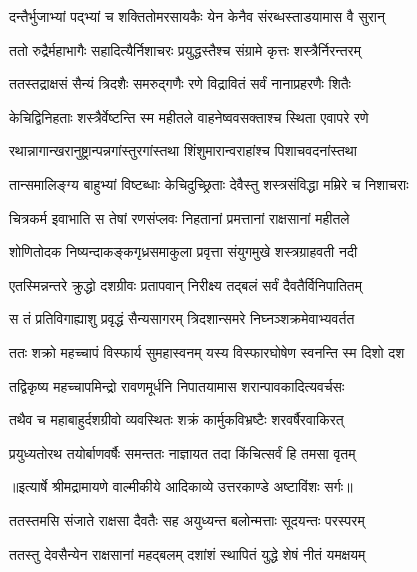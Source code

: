 \twolineshloka
{दन्तैर्भुजाभ्यां पद्भ्यां च शक्तितोमरसायकैः}
{येन केनैव संरब्धस्ताडयामास वै सुरान्} %

\twolineshloka
{ततो रुद्रैर्महाभागैः सहादित्यैर्निशाचरः}
{प्रयुद्धस्तैश्च संग्रामे कृत्तः शस्त्रैर्निरन्तरम्} %

\twolineshloka
{ततस्तद्राक्षसं सैन्यं त्रिदशैः समरुद्गणैः}
{रणे विद्रावितं सर्वं नानाप्रहरणैः शितैः} %

\twolineshloka
{केचिद्विनिहताः शस्त्रैर्वेष्टन्ति स्म महीतले}
{वाहनेष्ववसक्ताश्च स्थिता एवापरे रणे} %

\twolineshloka
{रथान्नागान्खरानुष्ट्रान्पन्नगांस्तुरगांस्तथा}
{शिंशुमारान्वराहांश्च पिशाचवदनांस्तथा} %

\twolineshloka
{तान्समालिङ्ग्य बाहुभ्यां विष्टब्धाः केचिदुच्छ्रिताः}
{देवैस्तु शस्त्रसंविद्धा मम्रिरे च निशाचराः} %

\twolineshloka
{चित्रकर्म इवाभाति स तेषां रणसंप्लवः}
{निहतानां प्रमत्तानां राक्षसानां महीतले} %

\twolineshloka
{शोणितोदक निष्यन्दाकङ्कगृध्रसमाकुला}
{प्रवृत्ता संयुगमुखे शस्त्रग्राहवती नदी} %

\twolineshloka
{एतस्मिन्नन्तरे क्रुद्धो दशग्रीवः प्रतापवान्}
{निरीक्ष्य तद्बलं सर्वं दैवतैर्विनिपातितम्} %

\twolineshloka
{स तं प्रतिविगाह्याशु प्रवृद्धं सैन्यसागरम्}
{त्रिदशान्समरे निघ्नञ्शक्रमेवाभ्यवर्तत} %

\twolineshloka
{ततः शक्रो महच्चापं विस्फार्य सुमहास्वनम्}
{यस्य विस्फारघोषेण स्वनन्ति स्म दिशो दश} %

\twolineshloka
{तद्विकृष्य महच्चापमिन्द्रो रावणमूर्धनि}
{निपातयामास शरान्पावकादित्यवर्चसः} %

\twolineshloka
{तथैव च महाबाहुर्दशग्रीवो व्यवस्थितः}
{शक्रं कार्मुकविभ्रष्टैः शरवर्षैरवाकिरत्} %

\twolineshloka
{प्रयुध्यतोरथ तयोर्बाणवर्षैः समन्ततः}
{नाज्ञायत तदा किंचित्सर्वं हि तमसा वृतम्} %


{॥इत्यार्षे श्रीमद्रामायणे वाल्मीकीये आदिकाव्ये उत्तरकाण्डे अष्टाविंशः सर्गः॥}


\twolineshloka
{ततस्तमसि संजाते राक्षसा दैवतैः सह}
{अयुध्यन्त बलोन्मत्ताः सूदयन्तः परस्परम्} %

\twolineshloka
{ततस्तु देवसैन्येन राक्षसानां महद्बलम्}
{दशांशं स्थापितं युद्धे शेषं नीतं यमक्षयम्} %

